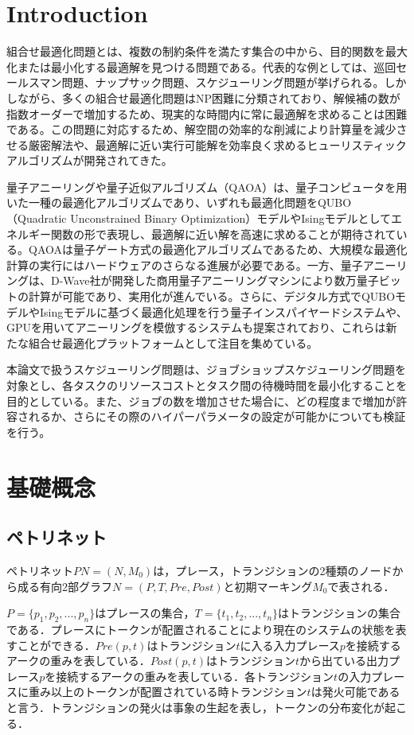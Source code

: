 \documentclass[conference]{IEEEtran}
\begin{document}
\section{Introduction}
組合せ最適化問題とは、複数の制約条件を満たす集合の中から、目的関数を最大化または最小化する最適解を見つける問題である。代表的な例としては、巡回セールスマン問題、ナップサック問題、スケジューリング問題が挙げられる。しかしながら、多くの組合せ最適化問題はNP困難に分類されており、解候補の数が指数オーダーで増加するため、現実的な時間内に常に最適解を求めることは困難である。この問題に対応するため、解空間の効率的な削減により計算量を減少させる厳密解法や、最適解に近い実行可能解を効率良く求めるヒューリスティックアルゴリズムが開発されてきた。

量子アニーリングや量子近似アルゴリズム（QAOA）は、量子コンピュータを用いた一種の最適化アルゴリズムであり、いずれも最適化問題をQUBO（Quadratic Unconstrained Binary Optimization）モデルやIsingモデルとしてエネルギー関数の形で表現し、最適解に近い解を高速に求めることが期待されている。QAOAは量子ゲート方式の最適化アルゴリズムであるため、大規模な最適化計算の実行にはハードウェアのさらなる進展が必要である。一方、量子アニーリングは、D-Wave社が開発した商用量子アニーリングマシンにより数万量子ビットの計算が可能であり、実用化が進んでいる。さらに、デジタル方式でQUBOモデルやIsingモデルに基づく最適化処理を行う量子インスパイヤードシステムや、GPUを用いてアニーリングを模倣するシステムも提案されており、これらは新たな組合せ最適化プラットフォームとして注目を集めている。

本論文で扱うスケジューリング問題は、ジョブショップスケジューリング問題を対象とし、各タスクのリソースコストとタスク間の待機時間を最小化することを目的としている。また、ジョブの数を増加させた場合に、どの程度まで増加が許容されるか、さらにその際のハイパーパラメータの設定が可能かについても検証を行う。

\section{基礎概念}

\subsection{ペトリネット}
ペトリネット$PN = (N,M_0)$は，プレース，トランジションの2種類のノードから成る有向2部グラフ$N = (P,T,Pre,Post)$と初期マーキング$M_0$で表される．\cite{b2}

$P = \{p_1,p_2,...,p_n\}$はプレースの集合，$T = \{t_1,t_2,...,t_n\}$はトランジションの集合である．プレースにトークンが配置されることにより現在のシステムの状態を表すことができる．$Pre(p,t)$はトランジション$t$に入る入力プレース$p$を接続するアークの重みを表している．$Post(p,t)$はトランジション$t$から出ている出力プレース$p$を接続するアークの重みを表している．各トランジション$t$の入力プレースに重み以上のトークンが配置されている時トランジション$t$は発火可能であると言う．トランジションの発火は事象の生起を表し，トークンの分布変化が起こる．
\end{document}
